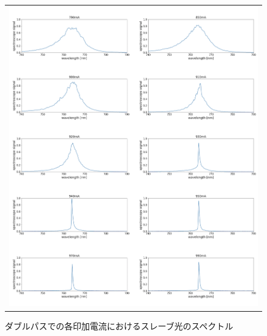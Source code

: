 \documentclass[uplatex, dvipdfmx, a4paper, report, papersize, 11pt]{jsbook}
\begin{document}
\begin{figure}[htpb]
\begin{tabular}{c}
      \begin{minipage}{1\hsize}
        \centering
          \includegraphics[keepaspectratio,  scale=0.340,  angle=0]
                          {figures/chapter4/double-pass-Slave-Spectrum.png}
                          \caption{ダブルパスでの各印加電流におけるスレーブ光のスペクトル}
                          \label{double-pass_I-Slave}

      \end{minipage}


    \end{tabular}
\end{figure}



\end{document}
